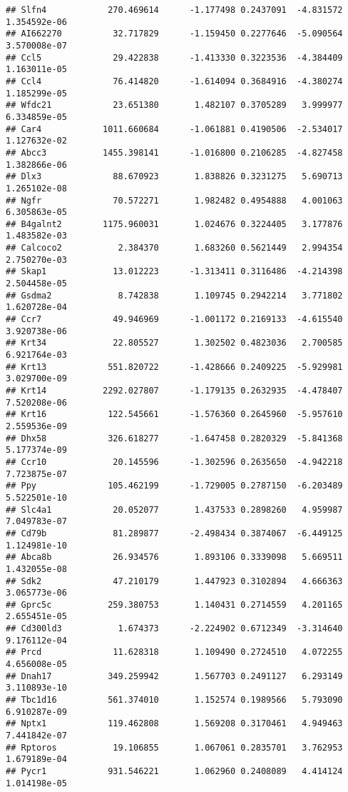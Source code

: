 \documentclass[
]{article}
\begin{document}
\begin{verbatim}
## Slfn4            270.469614      -1.177498 0.2437091  -4.831572 1.354592e-06
## AI662270          32.717829      -1.159450 0.2277646  -5.090564 3.570008e-07
## Ccl5              29.422838      -1.413330 0.3223536  -4.384409 1.163011e-05
## Ccl4              76.414820      -1.614094 0.3684916  -4.380274 1.185299e-05
## Wfdc21            23.651380       1.482107 0.3705289   3.999977 6.334859e-05
## Car4            1011.660684      -1.061881 0.4190506  -2.534017 1.127632e-02
## Abcc3           1455.398141      -1.016800 0.2106285  -4.827458 1.382866e-06
## Dlx3              88.670923       1.838826 0.3231275   5.690713 1.265102e-08
## Ngfr              70.572271       1.982482 0.4954888   4.001063 6.305863e-05
## B4galnt2        1175.960031       1.024676 0.3224405   3.177876 1.483582e-03
## Calcoco2           2.384370       1.683260 0.5621449   2.994354 2.750270e-03
## Skap1             13.012223      -1.313411 0.3116486  -4.214398 2.504458e-05
## Gsdma2             8.742838       1.109745 0.2942214   3.771802 1.620728e-04
## Ccr7              49.946969      -1.001172 0.2169133  -4.615540 3.920738e-06
## Krt34             22.805527       1.302502 0.4823036   2.700585 6.921764e-03
## Krt13            551.820722      -1.428666 0.2409225  -5.929981 3.029700e-09
## Krt14           2292.027807      -1.179135 0.2632935  -4.478407 7.520208e-06
## Krt16            122.545661      -1.576360 0.2645960  -5.957610 2.559536e-09
## Dhx58            326.618277      -1.647458 0.2820329  -5.841368 5.177374e-09
## Ccr10             20.145596      -1.302596 0.2635650  -4.942218 7.723875e-07
## Ppy              105.462199      -1.729005 0.2787150  -6.203489 5.522501e-10
## Slc4a1            20.052077       1.437533 0.2898260   4.959987 7.049783e-07
## Cd79b             81.289877      -2.498434 0.3874067  -6.449125 1.124981e-10
## Abca8b            26.934576       1.893106 0.3339098   5.669511 1.432055e-08
## Sdk2              47.210179       1.447923 0.3102894   4.666363 3.065773e-06
## Gprc5c           259.380753       1.140431 0.2714559   4.201165 2.655451e-05
## Cd300ld3           1.674373      -2.224902 0.6712349  -3.314640 9.176112e-04
## Prcd              11.628318       1.109490 0.2724510   4.072255 4.656008e-05
## Dnah17           349.259942       1.567703 0.2491127   6.293149 3.110893e-10
## Tbc1d16          561.374010       1.152574 0.1989566   5.793090 6.910287e-09
## Nptx1            119.462808       1.569208 0.3170461   4.949463 7.441842e-07
## Rptoros           19.106855       1.067061 0.2835701   3.762953 1.679189e-04
## Pycr1            931.546221       1.062960 0.2408089   4.414124 1.014198e-05

\end{verbatim}
\end{document}
